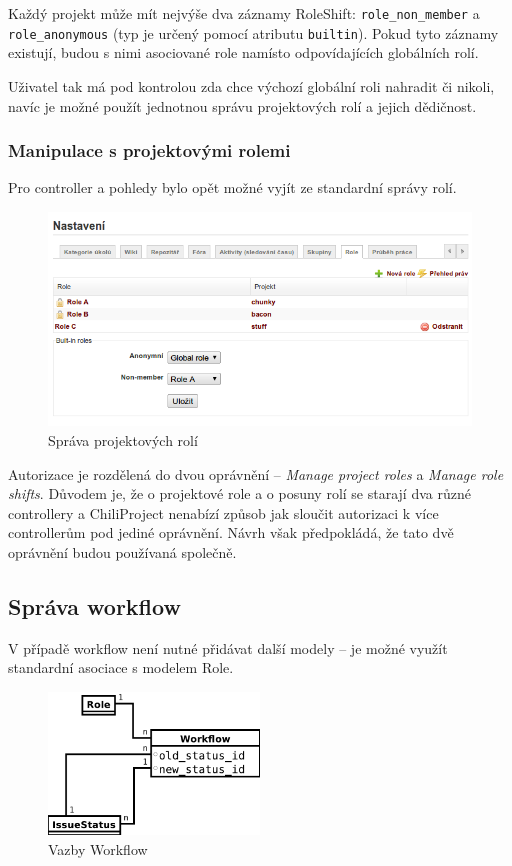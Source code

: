 \documentclass[thesis=B,czech]{FITthesis}[2012/05/02]
\begin{document}
Každý projekt může mít nejvýše dva záznamy RoleShift:
\lstinline!role_non_member! a \lstinline!role_anonymous! (typ je určený
pomocí atributu \lstinline!builtin!). Pokud tyto záznamy existují, budou
s nimi asociované role namísto odpovídajících globálních rolí.

Uživatel tak má pod kontrolou zda chce výchozí globální roli nahradit či
nikoli, navíc je možné použít jednotnou správu projektových rolí a
jejich dědičnost.

\subsubsection{Manipulace s projektovými rolemi}

Pro controller a pohledy bylo opět možné vyjít ze standardní správy
rolí.

\begin{figure}[tbp]
\centering
\includegraphics[width=1\textwidth]{role-gui1.png}
\caption{Správa projektových rolí}
\end{figure}

Autorizace je rozdělená do dvou oprávnění -- \emph{Manage project roles} a
\emph{Manage role shifts}. Důvodem je, že o projektové role a o posuny rolí
se starají dva různé controllery a ChiliProject nenabízí způsob jak
sloučit autorizaci k více controllerům pod jediné oprávnění. Návrh však
předpokládá, že tato dvě oprávnění budou používaná společně.

\subsection{Správa workflow}

V případě \gls{workflow} není nutné přidávat další modely -- je možné
využít standardní asociace s modelem Role.

\begin{figure}[htbp]
\centering
\includegraphics[width=0.5\textwidth]{role-er3.pdf}
\caption{Vazby Workflow}
\label{fig:Workflow}
\end{figure}
\end{document}
